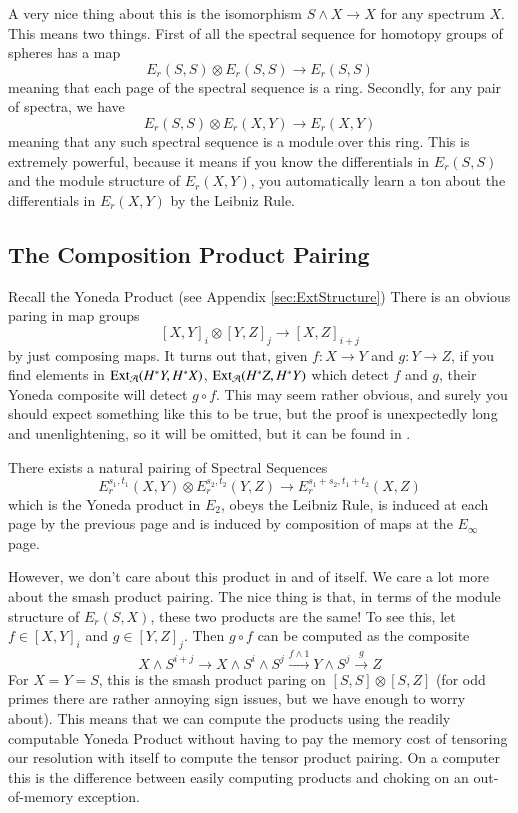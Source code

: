 A very nice thing about this is the isomorphism $S\wedge X\to X$ for any spectrum $X$.
This means two things.
First of all the spectral sequence for homotopy groups of spheres has a map
\[E_r(S,S)\otimes E_r(S,S)\to E_r(S,S)\]
meaning that each page of the spectral sequence is a ring.
Secondly, for any pair of spectra, we have
\[E_r(S,S)\otimes E_r(X,Y)\to E_r(X,Y)\]
meaning that any such spectral sequence is a module over this ring.
This is extremely powerful, because it means if you know the differentials in $E_r(S,S)$ and the module structure of $E_r(X,Y)$, you automatically learn a ton about the differentials in $E_r(X,Y)$ by the Leibniz Rule.  


\subsection{The Composition Product Pairing}
Recall the Yoneda Product (see Appendix \ref{sec:ExtStructure})
There is an obvious paring in map groups
\[[X,Y]_i\otimes [Y,Z]_j \to [X,Z]_{i+j}\]
by just composing maps.  
It turns out that, given $f:X\to Y$ and $g:Y\to Z$, if you find elements in $\operatorname{Ext}\nolimits_{\mathcal{A}}(H^*Y,H^*X)$, $\operatorname{Ext}\nolimits_{\mathcal{A}}(H^*Z,H^*Y)$ which detect $f$ and $g$, their Yoneda composite will detect $g\circ f$.  
This may seem rather obvious, and surely you should expect something like this to be true, but the proof is unexpectedly long and unenlightening, so it will be omitted, but it can be found in \cite{mossProduct}.  
\begin{Theorem}
  There exists a natural pairing of Spectral Sequences
  \[E^{s_1,t_1}_r(X,Y)\otimes E_r^{s_2,t_2}(Y,Z)\to E^{s_1+s_2,t_1+t_2}_r(X,Z)\]
  which is the Yoneda product in $E_2$, obeys the Leibniz Rule, is induced at each page by the previous page and is induced by composition of maps at the $E_\infty$ page.  
\end{Theorem}

However, we don't care about this product in and of itself.  
We care a lot more about the smash product pairing.
The nice thing is that, in terms of the module structure of $E_r(S,X)$, these two products are the same!
To see this, let $f\in [X,Y]_i$ and $g\in [Y,Z]_j$.  Then $g\circ f$ can be computed as the composite
\[X\wedge S^{i+j}\to X\wedge S^i\wedge S^j\xrightarrow{f\wedge1} Y\wedge S^j\xrightarrow{g} Z\]
For $X=Y=S$, this is the smash product paring on $[S,S]\otimes [S,Z]$ (for odd primes there are rather annoying sign issues, but we have enough to worry about).  
This means that we can compute the products using the readily computable Yoneda Product without having to pay the memory cost of tensoring our resolution with itself to compute the tensor product pairing.  
On a computer this is the difference between easily computing products and choking on an out-of-memory exception.  

